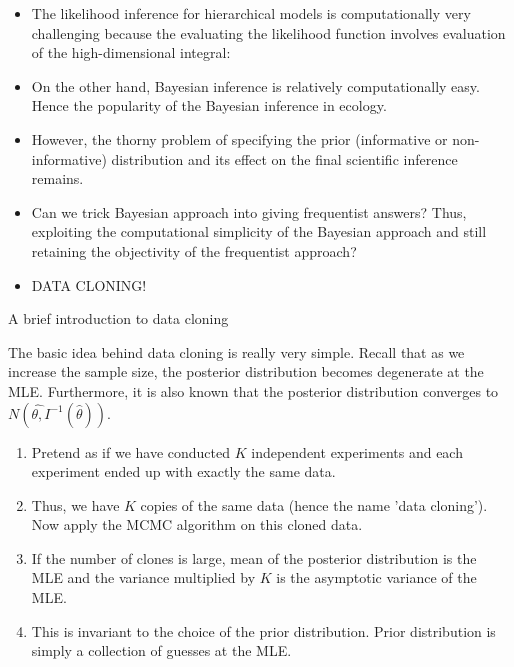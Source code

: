 \documentclass[10pt]{beamer}
\begin{document}
\begin{frame}
\begin{itemize}
\item The likelihood inference for hierarchical models is computationally very challenging because the evaluating the likelihood function involves evaluation of the high-dimensional integral:
\pause
\item On the other hand, Bayesian inference is relatively computationally easy. Hence the popularity of the Bayesian inference in ecology.
\pause
\item However, the thorny problem of specifying the prior (informative or non-informative) distribution and its effect on the final scientific inference remains. 
\pause
\item Can we trick Bayesian approach into giving frequentist answers? Thus, exploiting the computational simplicity of the Bayesian approach and still retaining the objectivity of the frequentist approach? 
\pause
\item \alert {DATA CLONING!}
\end{itemize}
\end{frame}

\begin{frame}
\begin{center}
\LARGE \alert {A brief introduction to data cloning}
\end{center}
The basic idea behind data cloning is really very simple. Recall that as we increase the sample size, the posterior distribution becomes degenerate at the MLE. Furthermore, it is also known that the posterior distribution converges to 
$N(\hat{\theta,}I^{-1}(\hat{\theta}))$. 

\begin{enumerate}
\item Pretend as if we have conducted $K$ \alert {independent} experiments and each experiment ended up with \alert {exactly the same data.}
\pause
\item Thus, we have $K$ copies of the same data (hence the name 'data cloning'). Now apply the MCMC algorithm on this cloned data. 
\pause
\item If the number of clones is large, mean of the posterior distribution is the MLE and the variance multiplied by $K$ is the asymptotic variance of the MLE. 
\pause
\item This is invariant to the choice of the prior distribution. Prior distribution is simply a collection of guesses at the MLE.
\end{enumerate}
\end{frame}
\end{document}
